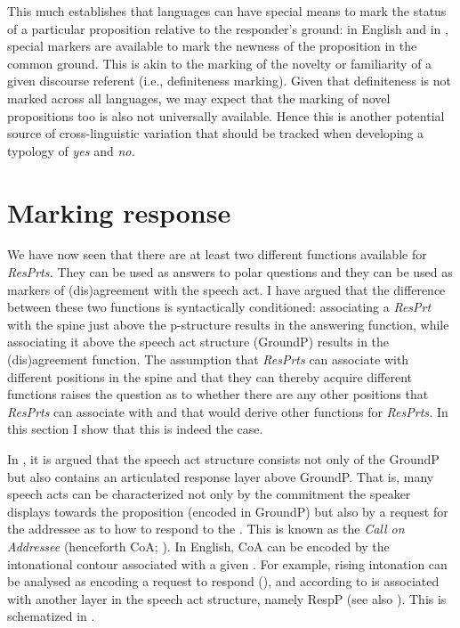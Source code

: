 \documentclass[output=paper]{LSP/langsci}
\begin{document}
This much establishes that languages can have special means to mark the status of a particular proposition relative to the responder’s ground: in English and in , special markers are available to mark the newness of the proposition in the common ground.
This is akin to the marking of the novelty or familiarity of a given discourse referent (i.e., definiteness marking). Given that definiteness is not marked across all languages, we may expect that the marking of novel propositions too is also not universally available.
Hence this is another potential source of cross-linguistic variation that should be tracked when developing a typology of \textit{yes} and \textit{no.}   

\section{Marking response}\label{sec:wiltschko:5}

We have now seen that there are at least two different functions available for \textit{ResPrts.} They can be used as answers to polar questions and they can be used as markers of (dis)agreement with the speech act. I have argued that the difference between these two functions is syntactically conditioned: associating a \textit{ResPrt} with the spine just above the p-structure results in the answering function, while associating it above the speech act structure (GroundP) results in the (dis)agreement function. The assumption that \textit{ResPrts} can associate with different positions in the spine and that they can thereby acquire different functions raises the {question} as to whether there are any other positions that \textit{ResPrts} can associate with and that would derive other functions for \textit{ResPrts.} In this section I show that this is indeed the case.


In \citet{WiltschkoInPress}, it is argued that the speech act structure consists not only of the GroundP but also contains an articulated response layer above GroundP. That is, many speech acts can be characterized not only by the commitment the speaker displays towards the proposition (encoded in GroundP) but also by a request for the addressee as to how to respond to the .
This is known as the \textit{Call on Addressee} (henceforth CoA; \citealt{BeyssadeMarandin2006}). In English, CoA can be encoded by the intonational contour associated with a given .
For example, rising intonation can be analysed as encoding a request to respond (\citealt{BeyssadeMarandin2006}), and according to \citet{WiltschkoInPress} is associated with another layer in the speech act structure, namely RespP (see also \citealt{HeimEtAl2014}). This is schematized in . 
\end{document}
